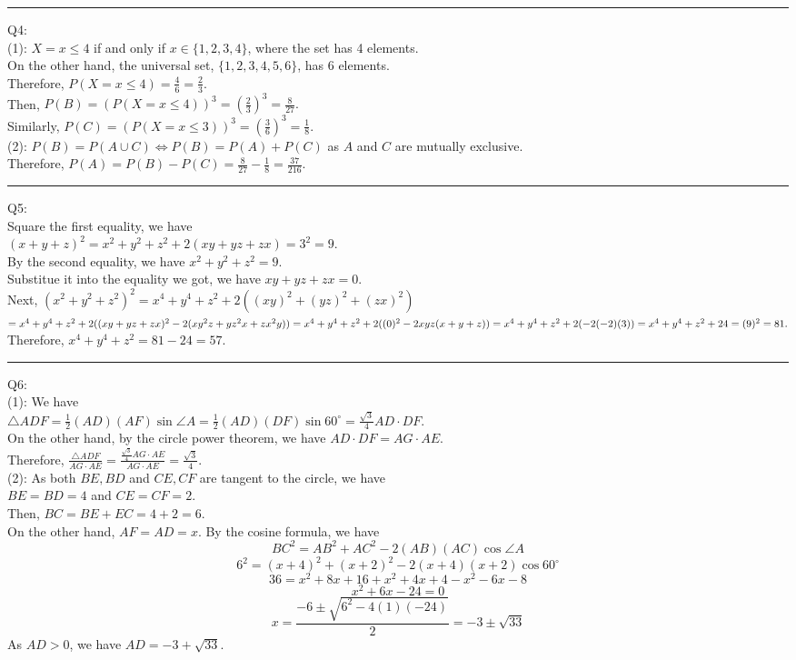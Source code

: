\documentclass{article}
\begin{document}
\vspace{1cm}
\hrule
\vspace{1cm}

\noindent Q4:\\
(1):  $X=x\leq4$ if and only if $x\in\{1,2,3,4\}$, where the set has 4 elements.\\
On the other hand, the universal set, $\{1,2,3,4,5,6\}$, has 6 elements.\\
Therefore, $P(X=x\leq 4)=\frac{4}{6}=\frac{2}{3}$.\\
Then, $P(B)=(P(X=x\leq4))^3=(\frac{2}{3})^3=\boxed{\frac{8}{27}}.$\\
Similarly, $P(C)=(P(X=x\leq3))^3=(\frac{3}{6})^3=\boxed{\frac{1}{8}}.$\\
(2): $P(B)=P(A\cup C)\iff P(B)=P(A)+P(C)$ as $A$ and $C$ are mutually exclusive.\\
Therefore, $P(A)=P(B)-P(C)=\frac{8}{27}-\frac{1}{8}=\boxed{\frac{37}{216}}.$

\vspace{1cm}
\hrule
\vspace{1cm}

\noindent Q5:\\
Square the first equality, we have \\$(x+y+z)^2=x^2+y^2+z^2+2(xy+yz+zx)=3^2=9.$\\
By the second equality, we have $x^2+y^2+z^2=9$.\\
Substitue it into the equality we got, we have $xy+yz+zx=\boxed0$.\\
Next, $(x^2+y^2+z^2)^2=x^4+y^4+z^2+\boxed{2}((xy)^2+(yz)^2+(zx)^2)$\\
$=x^4+y^4+z^2+2((xy+yz+zx)^2-2(xy^2z+yz^2x+zx^2y))\\
=x^4+y^4+z^2+2((0)^2-2xyz(x+y+z))\\
=x^4+y^4+z^2+2(-2(-2)(3))\\
=x^4+y^4+z^2+24=(9)^2=81.$\\
Therefore, $x^4+y^4+z^2=81-24=\boxed{57}.$

\vspace{1cm}
\hrule
\vspace{1cm}

\noindent Q6:\\
(1): We have \\
$\triangle ADF=\frac{1}{2}(AD)(AF)\sin\angle A=\frac{1}{2}(AD)(DF)\sin60^\circ=\frac{\sqrt3}{4}AD\cdot DF.$\\
On the other hand, by the circle power theorem, we have $AD\cdot DF=AG\cdot AE$.\\
Therefore, $\frac{\triangle ADF}{AG\cdot AE}=\frac{\frac{\sqrt3}{4}AG\cdot AE}{AG\cdot AE}=\boxed{\frac{\sqrt3}{4}}.$\\
(2): As both $BE,BD$ and $CE,CF$ are tangent to the circle, we have \\$BE=BD=4$ and $CE=CF=2$.\\
Then, $BC=BE+EC=4+2=\boxed6$.\\
On the other hand, $AF=AD=x$. By the cosine formula, we have 
$$BC^2=AB^2+AC^2-2(AB)(AC)\cos\angle A$$
$$6^2=(x+4)^2+(x+2)^2-2(x+4)(x+2)\cos 60^\circ$$
$$36=x^2+8x+16+x^2+4x+4-x^2-6x-8$$
$$x^2+\boxed6x-\boxed{24}=0$$
$$x=\frac{-6\pm\sqrt{6^2-4(1)(-24)}}{2}=-3\pm\sqrt{33}$$
As $AD>0$, we have $AD=\boxed{-3+\sqrt{33}}$.
\end{document}
